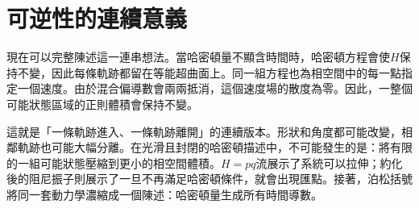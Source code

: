 \section{可逆性的連續意義}

現在可以完整陳述這一連串想法。當哈密頓量不顯含時間時，哈密頓方程會使\(H\)保持不變，因此每條軌跡都留在等能超曲面上。同一組方程也為相空間中的每一點指定一個速度。由於混合偏導數會兩兩抵消，這個速度場的散度為零。因此，一整個可能狀態區域的正則體積會保持不變。

這就是「一條軌跡進入、一條軌跡離開」的連續版本。形狀和角度都可能改變，相鄰軌跡也可能大幅分離。在光滑且封閉的哈密頓描述中，不可能發生的是：將有限的一組可能狀態壓縮到更小的相空間體積。\(H=pq\)流展示了系統可以拉伸；約化後的阻尼振子則展示了一旦不再滿足哈密頓條件，就會出現匯點。接著，泊松括號將同一套動力學濃縮成一個陳述：哈密頓量生成所有時間導數。